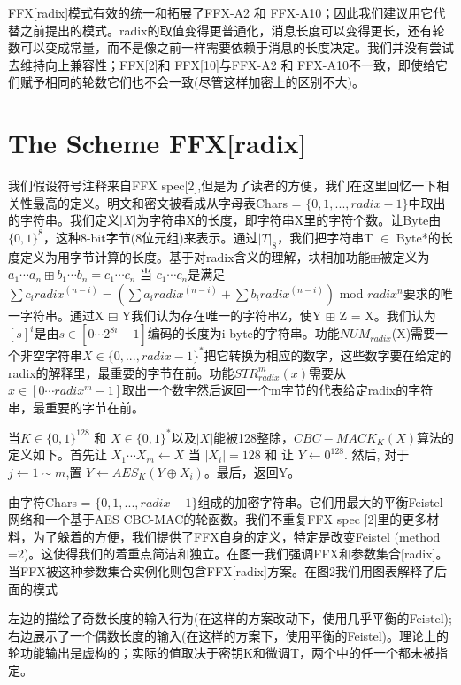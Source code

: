 FFX[radix]模式有效的统一和拓展了FFX-A2 和 FFX-A10；因此我们建议用它代替之前提出的模式。radix的取值变得更普通化，消息长度可以变得更长，还有轮数可以变成常量，而不是像之前一样需要依赖于消息的长度决定。我们并没有尝试去维持向上兼容性；FFX[2]和 FFX[10]与FFX-A2 和 FFX-A10不一致，即使给它们赋予相同的轮数它们也不会一致(尽管这样加密上的区别不大)。


\section{The Scheme FFX[radix]}

我们假设符号注释来自FFX spec[2],但是为了读者的方便，我们在这里回忆一下相关性最高的定义。明文和密文被看成从字母表Chars = $\{0,1,...,radix-1\}$中取出的字符串。我们定义$|X|$为字符串X的长度，即字符串X里的字符个数。让Byte由$\{0,1\}^8$，这种8-bit字节(8位元组)来表示。通过$|T|_8$，我们把字符串T $\in$ Byte*的长度定义为用字节计算的长度。基于对radix含义的理解，块相加功能$\boxplus$被定义为$a_1\cdots a_n \boxplus b_1\cdots b_n = c_1\cdots c_n$ 当 $c_1 \cdots c_n$是满足$\sum c_i radix^{(n-i)} = (\sum a_i radix^{(n-i)} + \sum b_i radix^{(n-i)})$ mod $radix^n$要求的唯一字符串。通过X $\boxminus$ Y我们认为存在唯一的字符串Z，使Y $\boxplus$ Z = X。我们认为$[s]^i$是由$s\in [0\cdots2^{8i}-1]$编码的长度为i-byte的字符串。功能$NUM_{radix}$(X)需要一个非空字符串$X \in \{0,...,radix-1\}^*$把它转换为相应的数字，这些数字要在给定的radix的解释里，最重要的字节在前。功能$STR_{radix}^m (x)$需要从$x \in [0\cdots radix^m-1]$取出一个数字然后返回一个m字节的代表给定radix的字符串，最重要的字节在前。

当$K \in \{0,1\}^{128}$ 和 $X \in \{0,1\}^*$以及$|X|$能被128整除，$CBC-MACK_K(X)$算法的定义如下。首先让 $X_1\cdots X_m \leftarrow X$ 当 $|X_i| = 128$ 和 让 $Y \leftarrow 0^{128}$. 然后, 对于 $j \leftarrow 1 \sim m$,置 $Y \leftarrow AES_K(Y \oplus X_i)$。最后，返回Y。



由字符Chars = $\{0,1,..., radix-1\}$组成的加密字符串。它们用最大的平衡Feistel网络和一个基于AES CBC-MAC的轮函数。我们不重复FFX spec [2]里的更多材料，为了躲着的方便，我们提供了FFX自身的定义，特定是改变Feistel (method =2)。这使得我们的着重点简洁和独立。在图一我们强调FFX和参数集合[radix]。当FFX被这种参数集合实例化则包含FFX[radix]方案。在图2我们用图表解释了后面的模式


左边的描绘了奇数长度的输入行为(在这样的方案改动下，使用几乎平衡的Feistel);\newline 右边展示了一个偶数长度的输入(在这样的方案下，使用平衡的Feistel)。理论上的轮功能输出是虚构的；实际的值取决于密钥K和微调T，两个中的任一个都未被指定。


